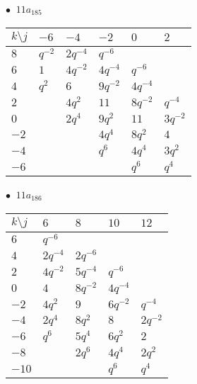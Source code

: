 \begin{minipage}{\linewidth}
$\bullet\ $ $11a_{185}$ \vspace{0.5em} \\
\begin{tabular}{l|lllll}
$k \setminus j$ & $-6$ & $-4$ & $-2$ & $0$ & $2$ \\
\hline
$8$ & $q^{-2}$ & $2q^{-4}$ & $q^{-6}$ &  &  \\
$6$ & $1$ & $4q^{-2}$ & $4q^{-4}$ & $q^{-6}$ &  \\
$4$ & $q^{2}$ & $6$ & $9q^{-2}$ & $4q^{-4}$ &  \\
$2$ &  & $4q^{2}$ & $11$ & $8q^{-2}$ & $q^{-4}$ \\
$0$ &  & $2q^{4}$ & $9q^{2}$ & $11$ & $3q^{-2}$ \\
$-2$ &  &  & $4q^{4}$ & $8q^{2}$ & $4$ \\
$-4$ &  &  & $q^{6}$ & $4q^{4}$ & $3q^{2}$ \\
$-6$ &  &  &  & $q^{6}$ & $q^{4}$ \\
\end{tabular}
\vspace{2em}
\end{minipage}
%
\begin{minipage}{\linewidth}
$\bullet\ $ $11a_{186}$ \vspace{0.5em} \\
\begin{tabular}{l|llll}
$k \setminus j$ & $6$ & $8$ & $10$ & $12$ \\
\hline
$6$ & $q^{-6}$ &  &  &  \\
$4$ & $2q^{-4}$ & $2q^{-6}$ &  &  \\
$2$ & $4q^{-2}$ & $5q^{-4}$ & $q^{-6}$ &  \\
$0$ & $4$ & $8q^{-2}$ & $4q^{-4}$ &  \\
$-2$ & $4q^{2}$ & $9$ & $6q^{-2}$ & $q^{-4}$ \\
$-4$ & $2q^{4}$ & $8q^{2}$ & $8$ & $2q^{-2}$ \\
$-6$ & $q^{6}$ & $5q^{4}$ & $6q^{2}$ & $2$ \\
$-8$ &  & $2q^{6}$ & $4q^{4}$ & $2q^{2}$ \\
$-10$ &  &  & $q^{6}$ & $q^{4}$ \\
\end{tabular}
\vspace{2em}
\end{minipage}
%
